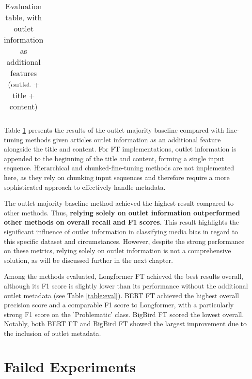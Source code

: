 \begin{table}[htbp]
\begin{tabular}{| c | l | r | r | r |}
    \end{tabular}
    \caption{Evaluation table, with outlet information as additional features (outlet + title + content)}
    \label{table:eval-outlet}
\end{table}

Table \ref{table:eval-outlet} presents the results of the outlet majority baseline compared with fine-tuning methods given articles outlet information as an additional feature alongside the title and content. For FT implementations, outlet information is appended to the beginning of the title and content, forming a single input sequence. Hierarchical and chunked-fine-tuning methods are not implemented here, as they rely on chunking input sequences and therefore require a more sophisticated approach to effectively handle metadata.

The outlet majority baseline method achieved the highest result compared to other methods. Thus, \textbf{relying solely on outlet information outperformed other methods on overall recall and F1 scores}. This result highlights the significant influence of outlet information in classifying media bias in regard to this specific dataset and circumstances. However, despite the strong performance on these metrics, relying solely on outlet information is not a comprehensive solution, as will be discussed further in the next chapter.

Among the methods evaluated, Longformer FT achieved the best results overall, although its F1 score is slightly lower than its performance without the additional outlet metadata (see Table \ref{table:eval}). BERT FT achieved the highest overall precision score and a comparable F1 score to Longformer, with a particularly strong F1 score on the 'Problematic' class. BigBird FT scored the lowest overall. Notably, both BERT FT and BigBird FT showed the largest improvement due to the inclusion of outlet metadata.

\section{Failed Experiments}

